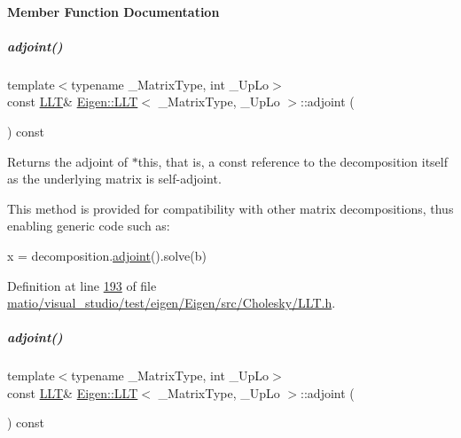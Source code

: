 \paragraph{Member Function Documentation}
\mbox{\label{group___cholesky___module_a559aba3a7c41f7fc87ec84327bb72ccd}} 
\subparagraph{\texorpdfstring{adjoint()}{adjoint()}\hspace{0.1cm}{\footnotesize\ttfamily [1/2]}}
{\footnotesize\ttfamily template$<$typename \+\_\+\+Matrix\+Type, int \+\_\+\+Up\+Lo$>$ \\
const \hyperlink{group___cholesky___module_class_eigen_1_1_l_l_t}{L\+LT}\& \hyperlink{group___cholesky___module_class_eigen_1_1_l_l_t}{Eigen\+::\+L\+LT}$<$ \+\_\+\+Matrix\+Type, \+\_\+\+Up\+Lo $>$\+::adjoint (\begin{DoxyParamCaption}{ }\end{DoxyParamCaption}) const\hspace{0.3cm}{\ttfamily [inline]}}

\begin{DoxyReturn}{Returns}
the adjoint of {\ttfamily $\ast$this}, that is, a const reference to the decomposition itself as the underlying matrix is self-\/adjoint.
\end{DoxyReturn}
This method is provided for compatibility with other matrix decompositions, thus enabling generic code such as\+: 
\begin{DoxyCode}
x = decomposition.\hyperlink{group___core___module_afacca1f88da57e5cd87dd07c8ff926bb}{adjoint}().solve(b) 
\end{DoxyCode}
 

Definition at line \hyperlink{matio_2visual__studio_2test_2eigen_2_eigen_2src_2_cholesky_2_l_l_t_8h_source_l00193}{193} of file \hyperlink{matio_2visual__studio_2test_2eigen_2_eigen_2src_2_cholesky_2_l_l_t_8h_source}{matio/visual\+\_\+studio/test/eigen/\+Eigen/src/\+Cholesky/\+L\+L\+T.\+h}.

\mbox{\label{group___cholesky___module_a559aba3a7c41f7fc87ec84327bb72ccd}} 
\subparagraph{\texorpdfstring{adjoint()}{adjoint()}\hspace{0.1cm}{\footnotesize\ttfamily [2/2]}}
{\footnotesize\ttfamily template$<$typename \+\_\+\+Matrix\+Type, int \+\_\+\+Up\+Lo$>$ \\
const \hyperlink{group___cholesky___module_class_eigen_1_1_l_l_t}{L\+LT}\& \hyperlink{group___cholesky___module_class_eigen_1_1_l_l_t}{Eigen\+::\+L\+LT}$<$ \+\_\+\+Matrix\+Type, \+\_\+\+Up\+Lo $>$\+::adjoint (\begin{DoxyParamCaption}{ }\end{DoxyParamCaption}) const\hspace{0.3cm}{\ttfamily [inline]}}

